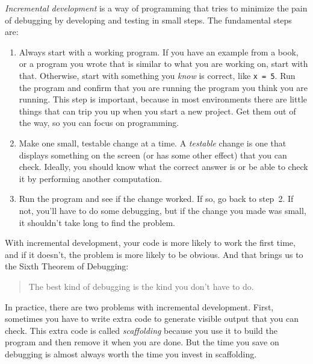 \emph{Incremental development} is a way of programming that tries
to minimize the pain of debugging by developing and testing in small steps.  The fundamental steps are:

\begin{enumerate}

\item Always start with a working program.  If you have an
example from a book, or a program you wrote that is similar to
what you are working on, start with that.  Otherwise, start with
something you \emph{know}  is correct, like \lstinline{x = 5}.  Run the program
and confirm that you are running the program you think you are
running.
This step is important, because in most environments there
are little things that can trip you up when you start a new
project.  Get them out of the way, so you can focus on programming.

\item Make one small, testable change at a time.  A \emph{testable}
change is one that displays something on the screen (or has some
other effect) that you can check.  Ideally, you should know what
the correct answer is or be able to check it by performing another
computation.

\item Run the program and see if the change worked.  If so, go back
to step~2.  If not, you'll have to do some debugging, but if the
change you made was small, it shouldn't take long to find the problem.

\end{enumerate}


With incremental development, your code is more likely to work the first time, and if it doesn't, the problem is more likely to be obvious.  And that brings us to the Sixth Theorem of Debugging:

\begin{quote}
The best kind of debugging is the kind you don't have to do.
\end{quote}

In practice, there are two problems with incremental development.
First, sometimes you have to write extra code to
generate visible output that you can check.  This extra code is
called \emph{scaffolding} because you use it to build the program
and then remove it when you are done.  But the time you save on
debugging is almost always worth the time you invest in
scaffolding.

